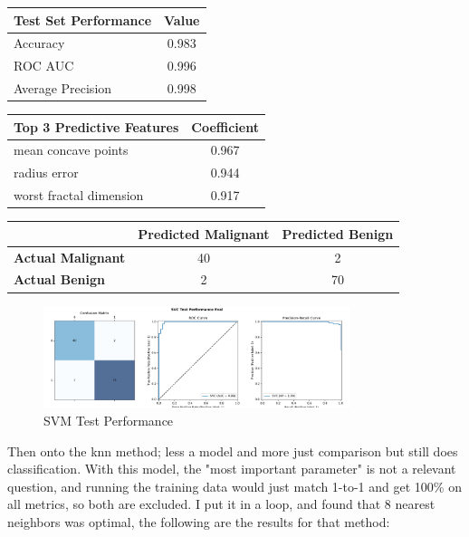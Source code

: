 \documentclass[letterpaper, 11pt]{amsart}
\begin{document}
\begin{table}[h]
\centering
\begin{tabular}{l|c|}
\textbf{Test Set Performance} & \textbf{Value} \\
\hline
Accuracy & 0.983 \\
ROC AUC & 0.996 \\
Average Precision & 0.998 \\
\hline
\end{tabular}
\end{table}

\begin{table}[h]
\centering
\begin{tabular}{l|c|}
\textbf{Top 3 Predictive Features} & \textbf{Coefficient} \\
\hline
mean concave points & 0.967 \\
radius error & 0.944 \\
worst fractal dimension & 0.917 \\
\hline
\end{tabular}
\end{table}


\begin{center}
\begin{tabular}{l|c|c|}
 & \textbf{Predicted Malignant} & \textbf{Predicted Benign} \\
\hline
\textbf{Actual Malignant} & 40 & 2 \\
\hline
\textbf{Actual Benign} & 2 & 70 \\
\hline
\end{tabular}
\end{center}

\begin{figure}[h]
\centering
\includegraphics[width=0.8\textwidth]{plots/svc_test_eval.png}
\caption{SVM Test Performance}
\end{figure}



Then onto the knn method; less a model and more just comparison but still does classification.
With this model, the "most important parameter" is not a relevant question, and running the training data would just match 1-to-1 and get 100\% on all metrics, so both are excluded.
I put it in a loop, and found that 8 nearest neighbors was optimal, the following are the results for that method:
\end{document}
